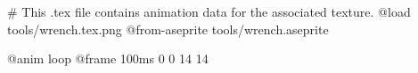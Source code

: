 # This .tex file contains animation data for the associated texture.
@load tools/wrench.tex.png
@from-aseprite tools/wrench.aseprite

@anim loop
	@frame 100ms 0 0 14 14

